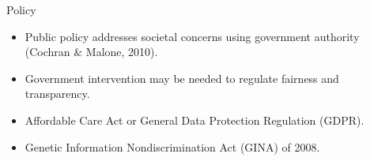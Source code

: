 \begin{frame}{Policy}
	\begin{itemize}
		\item Public policy addresses societal concerns using government authority (Cochran \& Malone, 2010).
		\item Government intervention may be needed to regulate fairness and transparency.
		\item Affordable Care Act or General Data Protection Regulation (GDPR).
		\item Genetic Information Nondiscrimination Act (GINA) of 2008.
	\end{itemize}
\end{frame}

